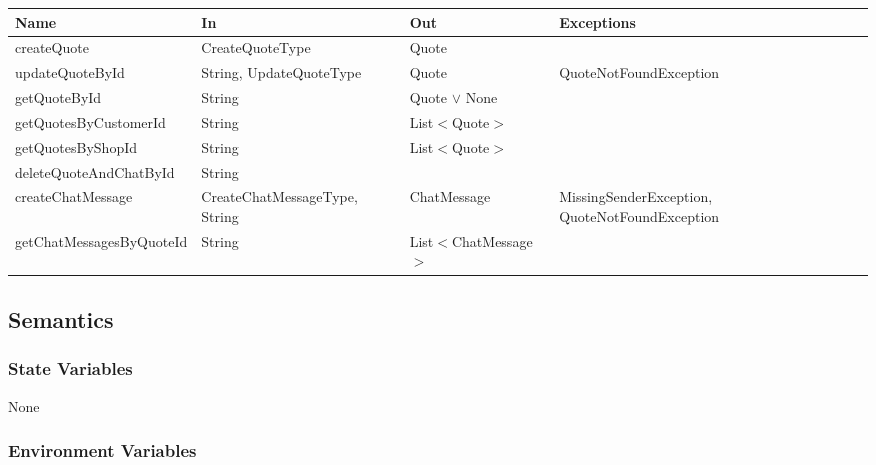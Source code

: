 \documentclass[12pt, titlepage]{article}
\begin{document}
\begin{center}
	\begin{adjustbox}{width=\textwidth}
		\begin{tabular}{llll}
			\hline
			\textbf{Name}            & \textbf{In}                   & \textbf{Out}          & \textbf{Exceptions}                            \\
			\hline
			createQuote              & CreateQuoteType               & Quote                 & ~                                              \\
			updateQuoteById          & String, UpdateQuoteType       & Quote                 & QuoteNotFoundException                         \\
			getQuoteById             & String                        & Quote $\lor$ None     & ~                                              \\
			getQuotesByCustomerId    & String                        & List$<$Quote$>$       & ~                                              \\
			getQuotesByShopId        & String                        & List$<$Quote$>$       & ~                                              \\
			deleteQuoteAndChatById   & String                        & ~                     & ~                                              \\
			createChatMessage        & CreateChatMessageType, String & ChatMessage           & MissingSenderException, QuoteNotFoundException \\
			getChatMessagesByQuoteId & String                        & List$<$ChatMessage$>$ & ~                                              \\
			\hline
		\end{tabular}
	\end{adjustbox}
\end{center}

\subsection{Semantics}

\subsubsection{State Variables}

None

\subsubsection{Environment Variables}
\end{document}
